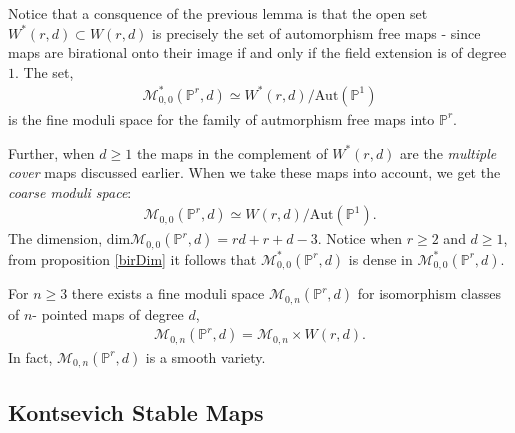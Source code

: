 Notice that a consquence of the previous lemma is that the open set $W^{*}(r,d) \subset W(r,d)$ is precisely the set of automorphism free maps - since maps are birational onto their image if and only if the field extension is of degree $1$. 
The set, 
\begin{align*}
    \mathcal{M}^{*}_{0,0}(\mathbb{P}^{r},d) \simeq W^{*}(r,d)/\text{Aut}(\mathbb{P}^{1})
\end{align*}
is the fine moduli space for the family of autmorphism free maps into $\mathbb{P}^{r}$.
\par Further, when $d \geq 1$ the maps in the complement of $W^{*}(r,d)$ are the \textit{multiple cover} maps discussed earlier. 
When we take these maps into account, we get the \textit{coarse moduli space}:
\begin{align*}
    \mathcal{M}_{0,0}(\mathbb{P}^{r},d) \simeq W(r,d)/\text{Aut}(\mathbb{P}^{1}).
\end{align*}
The dimension, $\text{dim}\mathcal{M}_{0,0}(\mathbb{P}^{r},d) = rd + r + d -3$.
Notice when $r\geq 2$ and $d \geq 1$, from proposition \ref{birDim} it follows that $\mathcal{M}^{*}_{0,0}(\mathbb{P}^{r},d)$ is dense in $\mathcal{M}^{*}_{0,0}(\mathbb{P}^{r},d)$.


\begin{proposition}
    For $n \geq 3$ there exists a fine moduli space $\mathcal{M}_{0,n}(\mathbb{P}^{r},d)$ for isomorphism classes of $n$- pointed maps of degree $d$,
    \begin{align*}
        \mathcal{M}_{0,n}(\mathbb{P}^{r},d) = \mathcal{M}_{0,n} \times W(r,d).
    \end{align*}
    In fact, $\mathcal{M}_{0,n}(\mathbb{P}^{r},d)$ is a smooth variety.
\end{proposition}

\subsection{Kontsevich Stable Maps}


